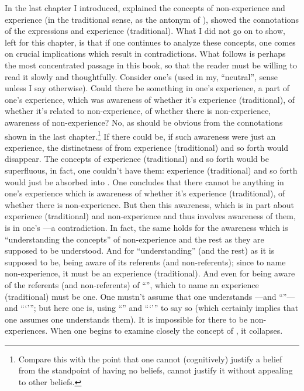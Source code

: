 In the last chapter I introduced, explained the concepts of non-ex\-per\-ience and experience (in the traditional sense, as the antonym of ), showed the connotations of the expressions  and experience (traditional). What I did not go on to show, left for this chapter, is that if one continues to analyze these concepts, one comes on crucial implications which result in contradictions. What follows is perhaps the most concentrated passage in this book, so that the reader must be willing to read it slowly and thoughtfully. Consider one's  (used in my, \enquote{neutral}, sense unless I say otherwise). Could there be something in one's experience, a part of one's experience, which was awareness of whether it's experience (traditional), of whether it's related to non-experience, of whether there is non-experience, awareness of non-experience? No, as should be obvious from the connotations shown in the last chapter.\footnote{Compare this with the point that one cannot (cognitively) justify a belief from the standpoint of having no beliefs, cannot justify it without appealing to other beliefs.} If there could be, if such awareness were just an experience, the distinctness of  from experience (traditional) and so forth would disappear. The concepts of experience (traditional) and so forth would be superfluous, in fact, one couldn't have them: experience (traditional) and so forth would just be absorbed into . One concludes that there cannot be anything in one's experience which is awareness of whether it's experience (traditional), of whether there is non-experience. But then this awareness, which is in part about experience (traditional) and non-experience and thus involves awareness of them, is in one's ---a contradiction. In fact, the same holds for the awareness which is \enquote{understanding the concepts} of non-experience and the rest as they are supposed to be understood. And for \enquote{understanding} (and the rest) as it is supposed to be, being aware of its referents (and non-referents); since to name non-experience, it must be an experience (traditional). And even for being aware of the referents (and non-referents) of \enquote{}, which to name an experience (traditional) must be one. One mustn't assume that one understands ---and \enquote{}---and \enquote{\enquote{}}; but here one is, using \enquote{} and \enquote{\enquote{}} to say so (which certainly implies that one assumes one understands them). It is impossible for there to be non-experiences. When one begins to examine closely the concept of , it collapses. 

